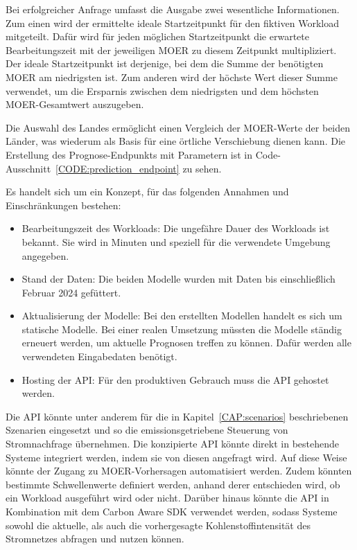 Bei erfolgreicher Anfrage umfasst die Ausgabe zwei wesentliche Informationen.
Zum einen wird der ermittelte ideale Startzeitpunkt für den fiktiven Workload mitgeteilt.
Dafür wird für jeden möglichen Startzeitpunkt die erwartete Bearbeitungszeit mit der jeweiligen \ac{MOER} zu diesem Zeitpunkt multipliziert.
Der ideale Startzeitpunkt ist derjenige, bei dem die Summe der benötigten \ac{MOER} am niedrigsten ist.
Zum anderen wird der höchste Wert dieser Summe verwendet, um die Ersparnis zwischen dem niedrigsten und dem höchsten \ac{MOER}-Gesamtwert auszugeben.

Die Auswahl des Landes ermöglicht einen Vergleich der \ac{MOER}-Werte der beiden Länder, was wiederum als Basis für eine örtliche Verschiebung dienen kann.
Die Erstellung des Prognose-Endpunkts mit Parametern ist in Code-Ausschnitt~\ref{CODE:prediction_endpoint} zu sehen.


Es handelt sich um ein Konzept, für das folgenden Annahmen und Einschränkungen bestehen:
\begin{itemize}
 \item Bearbeitungszeit des Workloads: Die ungefähre Dauer des Workloads ist bekannt.
 Sie wird in Minuten und speziell für die verwendete Umgebung angegeben.
 \item Stand der Daten: Die beiden Modelle wurden mit Daten bis einschließlich Februar 2024 gefüttert.
 \item Aktualisierung der Modelle: Bei den erstellten Modellen handelt es sich um statische Modelle.
 Bei einer realen Umsetzung müssten die Modelle ständig erneuert werden, um aktuelle Prognosen treffen zu können.
 Dafür werden alle verwendeten Eingabedaten benötigt.
 \item Hosting der \ac{API}: Für den produktiven Gebrauch muss die \ac{API} gehostet werden.
\end{itemize}

Die \ac{API} könnte unter anderem für die in Kapitel~\ref{CAP:scenarios} beschriebenen Szenarien eingesetzt und so die emissionsgetriebene Steuerung von Stromnachfrage übernehmen.
Die konzipierte \ac{API} könnte direkt in bestehende Systeme integriert werden, indem sie von diesen angefragt wird.
Auf diese Weise könnte der Zugang zu \ac{MOER}-Vorhersagen automatisiert werden.
Zudem könnten bestimmte Schwellenwerte definiert werden, anhand derer entschieden wird, ob ein Workload ausgeführt wird oder nicht.
Darüber hinaus könnte die \ac{API} in Kombination mit dem Carbon Aware \ac{SDK} verwendet werden, sodass Systeme sowohl die aktuelle, als auch die vorhergesagte Kohlenstoffintensität des Stromnetzes abfragen und nutzen können.


